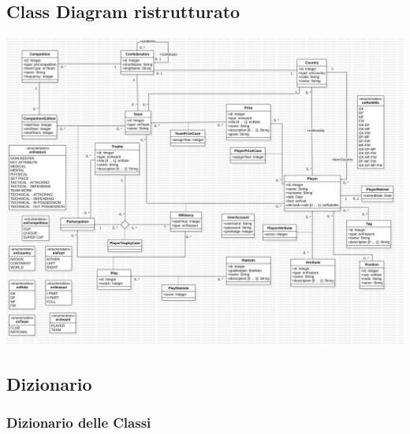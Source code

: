 \subsection{Class Diagram ristrutturato}
\includegraphics[width=\textwidth]{res/class_diagram_ristr}
\newpage

\subsection{Dizionario}

\subsubsection{Dizionario delle Classi}



